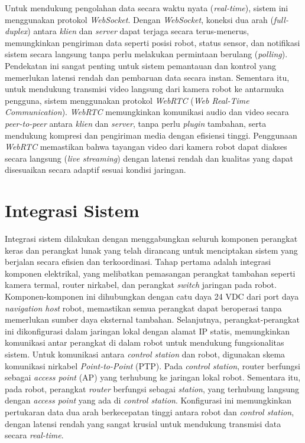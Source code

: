 Untuk mendukung pengolahan data secara waktu nyata (\emph{real-time}), sistem ini menggunakan protokol \emph{WebSocket}. Dengan \emph{WebSocket}, koneksi dua arah (\emph{full-duplex}) antara \emph{klien} dan \emph{server} dapat terjaga secara terus-menerus, memungkinkan pengiriman data seperti posisi robot, status sensor, dan notifikasi sistem secara langsung tanpa perlu melakukan permintaan berulang (\emph{polling}). Pendekatan ini sangat penting untuk sistem pemantauan dan kontrol yang memerlukan latensi rendah dan pembaruan data secara instan. Sementara itu, untuk mendukung transmisi video langsung dari kamera robot ke antarmuka pengguna, sistem menggunakan protokol \emph{WebRTC} (\emph{Web Real-Time Communication}). \emph{WebRTC} memungkinkan komunikasi audio dan video secara \emph{peer-to-peer} antara \emph{klien} dan \emph{server}, tanpa perlu \emph{plugin} tambahan, serta mendukung kompresi dan pengiriman media dengan efisiensi tinggi. Penggunaan \emph{WebRTC} memastikan bahwa tayangan video dari kamera robot dapat diakses secara langsung (\emph{live streaming}) dengan latensi rendah dan kualitas yang dapat disesuaikan secara adaptif sesuai kondisi jaringan.

\section{Integrasi Sistem}
Integrasi sistem dilakukan dengan menggabungkan seluruh komponen perangkat keras dan perangkat lunak yang telah dirancang untuk menciptakan sistem yang berjalan secara efisien dan terkoordinasi. Tahap pertama adalah integrasi komponen elektrikal, yang melibatkan pemasangan perangkat tambahan seperti kamera termal, router nirkabel, dan perangkat \emph{switch} jaringan pada robot. Komponen-komponen ini dihubungkan dengan catu daya 24 VDC dari port daya \emph{navigation host} robot, memastikan semua perangkat dapat beroperasi tanpa memerlukan sumber daya eksternal tambahan. Selanjutnya, perangkat-perangkat ini dikonfigurasi dalam jaringan lokal dengan alamat IP statis, memungkinkan komunikasi antar perangkat di dalam robot untuk mendukung fungsionalitas sistem. Untuk komunikasi antara \emph{control station} dan robot, digunakan skema komunikasi nirkabel \emph{Point-to-Point} (PTP). Pada \emph{control station}, router berfungsi sebagai \emph{access point} (AP) yang terhubung ke jaringan lokal robot. Sementara itu, pada robot, perangkat \emph{router} berfungsi sebagai \emph{station}, yang terhubung langsung dengan \emph{access point} yang ada di \emph{control station}. Konfigurasi ini memungkinkan pertukaran data dua arah berkecepatan tinggi antara robot dan \emph{control station}, dengan latensi rendah yang sangat krusial untuk mendukung transmisi data secara \emph{real-time}.

